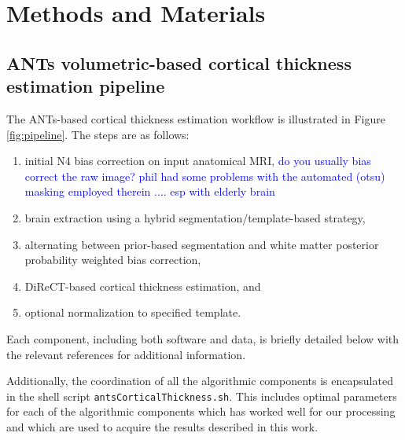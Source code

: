 \section{Methods and Materials}

\subsection{ANTs volumetric-based cortical thickness estimation pipeline}

The ANTs-based cortical thickness estimation workflow is illustrated 
in Figure \ref{fig:pipeline}.  The steps are as follows:
\begin{enumerate}
  \item initial N4 bias correction on input anatomical MRI,
    \textcolor{blue}{do you usually bias correct the raw image?  phil
      had some problems with the automated (otsu) masking employed
      therein .... esp with elderly brain}
  \item brain extraction using a hybrid segmentation/template-based strategy,
  \item alternating between prior-based segmentation and white matter posterior
        probability weighted bias correction,
  \item DiReCT-based cortical thickness estimation, and
  \item optional normalization to specified template.
\end{enumerate}
Each component, including both software and data, is briefly detailed 
below with the relevant references for additional information. 


Additionally, the coordination of all the algorithmic components is
encapsulated in the shell script \verb#antsCorticalThickness.sh#.  This includes
optimal parameters for each of the algorithmic components which has worked
well for our processing and which are used to acquire the results 
described in this work.

